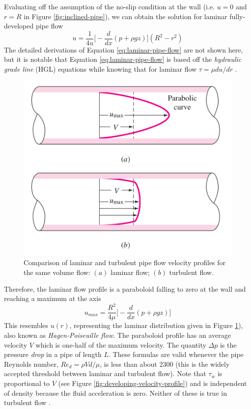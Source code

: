 \documentclass[11pt]{article} %
\numberwithin{equation}{section} %
\begin{document}
Evaluating off the assumption of the no-slip condition at the wall (i.e. $u=0$ and $r=R$ in Figure \ref{fig:inclined-pipe}), we can obtain the solution for laminar fully-developed pipe flow
\begin{equation} \label{eq:laminar-pipe-flow}
u = \frac{1}{4 u} \big[ -\frac{d}{dx} (p + \rho g z) \big] (R^{2} - r^{2})
\end{equation}
The detailed derivations of Equation \ref{eq:laminar-pipe-flow} are not shown here, but it is notable that Equation \ref{eq:laminar-pipe-flow} is based off the \textit{hydraulic grade line} (HGL) equations while knowing that for laminar flow $\tau = \mu du/dr$ \cite{fluid-mechanics}.
\begin{figure}[!htb]
\centering
\includegraphics[scale=0.35]{comparing_velocity_profiles}
\caption{Comparison of laminar and turbulent pipe flow velocity profiles for the same volume flow: $(a)$ laminar flow; $(b)$ turbulent flow.}
\label{fig:comparing-velocity-profiles}
\end{figure}
Therefore, the laminar flow profile is a paraboloid falling to zero at the wall and reaching a maximum at the axis
\begin{equation}
u_{max} = \frac{R^{2}}{4 \mu} \big[  -\frac{d}{dx} (p + \rho g z) \big]
\end{equation}
This resembles $u(r)$, representing the laminar distribution given in Figure \ref{fig:comparing-velocity-profiles}), also known as \textit{Hagen-Poiseuille flow}. The paraboloid profile has an average velocity $V$ which is one-half of the maximum velocity. The quantity $\Delta p$ is the pressure \textit{drop} in a pipe of length $L$. These formulas are valid whenever the pipe Reynolds number, $Re_{d} = \rho V d/\mu$, is less than about 2300 (this is the widely accepted threshold between laminar and turbulent flow). Note that $\tau_{w}$ is proportional to $V$ (see Figure \ref{fig:developing-velocity-profile}) and is independent of density because the fluid acceleration is zero. Neither of these is true in turbulent flow \cite{fluid-mechanics}.
\end{document}
